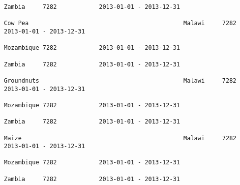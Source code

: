 \documentclass[11pt]{article}
\begin{document}
\begin{Verbatim}[commandchars=\\\{\}]
                                                                                                                                                                                                                 Zambia     7282            2013-01-01 - 2013-12-31   
                                                                                                                                                              Cow Pea                                            Malawi     7282            2013-01-01 - 2013-12-31   
                                                                                                                                                                                                                 Mozambique 7282            2013-01-01 - 2013-12-31   
                                                                                                                                                                                                                 Zambia     7282            2013-01-01 - 2013-12-31   
                                                                                                                                                              Groundnuts                                         Malawi     7282            2013-01-01 - 2013-12-31   
                                                                                                                                                                                                                 Mozambique 7282            2013-01-01 - 2013-12-31   
                                                                                                                                                                                                                 Zambia     7282            2013-01-01 - 2013-12-31   
                                                                                                                                                              Maize                                              Malawi     7282            2013-01-01 - 2013-12-31   
                                                                                                                                                                                                                 Mozambique 7282            2013-01-01 - 2013-12-31   
                                                                                                                                                                                                                 Zambia     7282            2013-01-01 - 2013-12-31   

\end{Verbatim}
\end{document}
